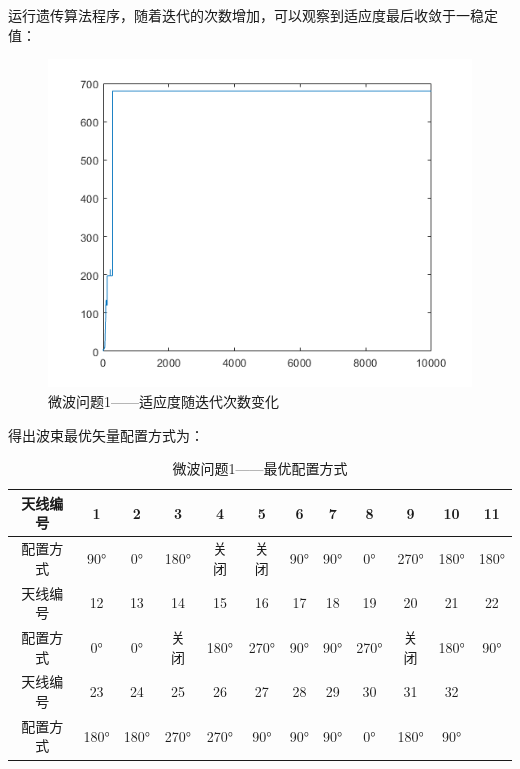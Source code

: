 \documentclass[UTF8,12pt]{ctexart}
\begin{document}
        运行遗传算法程序，随着迭代的次数增加，可以观察到适应度最后收敛于一稳定值：
        \begin{figure}[H]
            \centering
            \includegraphics[scale=0.82]{lian1.png}
            \caption{微波问题1——适应度随迭代次数变化}
            \end{figure}
        得出波束最优矢量配置方式为：
      \begin{table}[htbp]
        \centering
        \caption{微波问题1——最优配置方式}
          \begin{tabular}{cccccccccccc}
          \toprule
          天线编号   & 1      & 2      & 3      & 4      & 5      & 6      & 7      & 8      & 9      & 10     & 11 \\
          \midrule
          配置方式   & 90°    & 0°     & 180°   & 关闭     & 关闭     & 90°    & 90°    & 0°     & 270°   & 180°   & 180° \\
          \midrule
          天线编号   & 12     & 13     & 14     & 15     & 16     & 17     & 18     & 19     & 20     & 21     & 22 \\
          \midrule
          配置方式   & 0°     & 0°     & 关闭     & 180°   & 270°   & 90°    & 90°    & 270°   & 关闭     & 180°   & 90° \\
          \midrule
          天线编号   & 23     & 24     & 25     & 26     & 27     & 28     & 29     & 30     & 31     & 32     &  \\
          \midrule
          配置方式   & 180°   & 180°   & 270°   & 270°   & 90°    & 90°    & 90°    & 0°     & 180°   & 90°    &  \\
          \bottomrule
          \end{tabular}%
        \label{tab:addlabel}%
      \end{table}%
\end{document}
